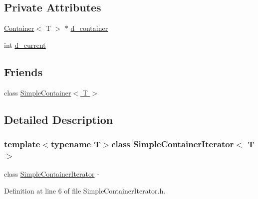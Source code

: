 \subsection*{Private Attributes}
\begin{DoxyCompactItemize}
\item 
\hyperlink{class_container}{Container}$<$ T $>$ $\ast$ \hyperlink{class_simple_container_iterator_a179c3b6ee590cd5476d6dee1c7b9a90e}{d\_\-container}
\item 
int \hyperlink{class_simple_container_iterator_a9b59aba2313334330daa03dd2253ddc1}{d\_\-current}
\end{DoxyCompactItemize}
\subsection*{Friends}
\begin{DoxyCompactItemize}
\item 
class \hyperlink{class_simple_container_iterator_af3eda3b215741021fb668d573cf344f3}{SimpleContainer$<$ T $>$}
\end{DoxyCompactItemize}


\subsection{Detailed Description}
\subsubsection*{template$<$typename T$>$class SimpleContainerIterator$<$ T $>$}

class \hyperlink{class_simple_container_iterator}{SimpleContainerIterator} -\/ 

Definition at line 6 of file SimpleContainerIterator.h.



